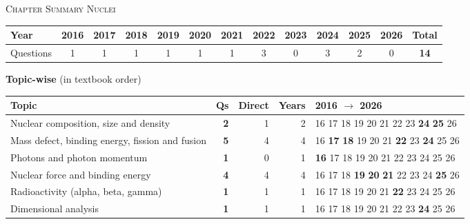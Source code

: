 \begin{center}{}\par
{\large\color{navy}\scshape Chapter Summary \textperiodcentered{} Nuclei}\end{center}
{\small\setlength{\tabcolsep}{3.5pt}
\begin{tabular*}{\linewidth}{@{\extracolsep{\fill}}l*{11}{c}c@{}}\toprule
Year & 2016 & 2017 & 2018 & 2019 & 2020 & 2021 & 2022 & 2023 & 2024 & 2025 & 2026 & Total\\\midrule
Questions & 1 & 1 & 1 & 1 & 1 & 1 & 3 & 0 & 3 & 2 & 0 & \textbf{14}\\\bottomrule\end{tabular*}}\par\medskip
{\small\textbf{\color{crimson}Topic-wise} (in textbook order)\par\smallskip
\begin{tabularx}{\linewidth}{@{}>{\raggedright\arraybackslash}Xrrrl@{}}\toprule
Topic & Qs & Direct & Years & 2016 $\rightarrow$ 2026\\\midrule
Nuclear composition, size and density & \textbf{2} & 1 & 2 & {\scriptsize {\color{gray!45}16} {\color{gray!45}17} {\color{gray!45}18} {\color{gray!45}19} {\color{gray!45}20} {\color{gray!45}21} {\color{gray!45}22} {\color{gray!45}23} \textbf{24} \textbf{25} {\color{gray!45}26}}\\
Mass defect, binding energy, fission and fusion & \textbf{5} & 4 & 4 & {\scriptsize {\color{gray!45}16} \textbf{17} \textbf{18} {\color{gray!45}19} {\color{gray!45}20} {\color{gray!45}21} \textbf{22} {\color{gray!45}23} \textbf{24} {\color{gray!45}25} {\color{gray!45}26}}\\
Photons and photon momentum & \textbf{1} & 0 & 1 & {\scriptsize \textbf{16} {\color{gray!45}17} {\color{gray!45}18} {\color{gray!45}19} {\color{gray!45}20} {\color{gray!45}21} {\color{gray!45}22} {\color{gray!45}23} {\color{gray!45}24} {\color{gray!45}25} {\color{gray!45}26}}\\
Nuclear force and binding energy & \textbf{4} & 4 & 4 & {\scriptsize {\color{gray!45}16} {\color{gray!45}17} {\color{gray!45}18} \textbf{19} \textbf{20} \textbf{21} {\color{gray!45}22} {\color{gray!45}23} {\color{gray!45}24} \textbf{25} {\color{gray!45}26}}\\
Radioactivity (alpha, beta, gamma) & \textbf{1} & 1 & 1 & {\scriptsize {\color{gray!45}16} {\color{gray!45}17} {\color{gray!45}18} {\color{gray!45}19} {\color{gray!45}20} {\color{gray!45}21} \textbf{22} {\color{gray!45}23} {\color{gray!45}24} {\color{gray!45}25} {\color{gray!45}26}}\\
Dimensional analysis & \textbf{1} & 1 & 1 & {\scriptsize {\color{gray!45}16} {\color{gray!45}17} {\color{gray!45}18} {\color{gray!45}19} {\color{gray!45}20} {\color{gray!45}21} {\color{gray!45}22} {\color{gray!45}23} \textbf{24} {\color{gray!45}25} {\color{gray!45}26}}\\
\bottomrule\end{tabularx}}\par\medskip
